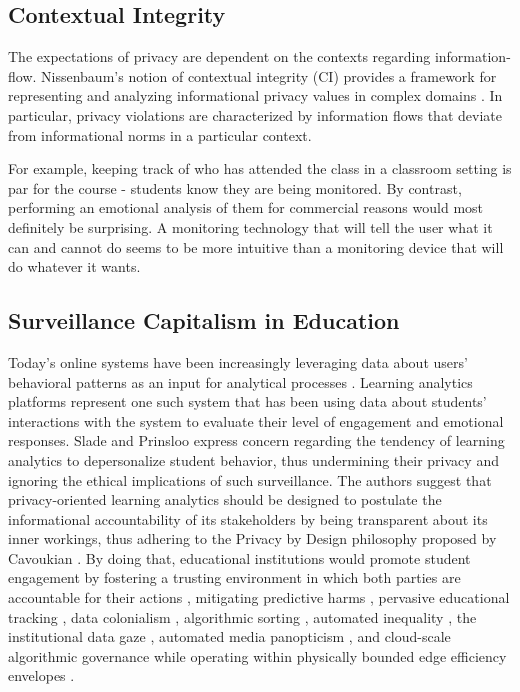\documentclass[conference]{IEEEtran}
\begin{document}
\subsection{Contextual Integrity}
The expectations of privacy are dependent on the contexts regarding information-flow. Nissenbaum’s notion of contextual integrity (CI) provides a framework for representing and analyzing informational privacy values in complex domains \cite{b4}. In particular, privacy violations are characterized by information flows that deviate from informational norms in a particular context.

For example, keeping track of who has attended the class in a classroom setting is par for the course - students know they are being monitored. By contrast, performing an emotional analysis of them for commercial reasons would most definitely be surprising. A monitoring technology that will tell the user what it can and cannot do seems to be more intuitive than a monitoring device that will do whatever it wants.

\subsection{Surveillance Capitalism in Education}
Today’s online systems have been increasingly leveraging data about users’ behavioral patterns as an input for analytical processes \cite{b10}. Learning analytics platforms represent one such system that has been using data about students’ interactions with the system to evaluate their level of engagement and emotional responses. Slade and Prinsloo \cite{b11} express concern regarding the tendency of learning analytics to depersonalize student behavior, thus undermining their privacy and ignoring the ethical implications of such surveillance. The authors suggest that privacy-oriented learning analytics should be designed to postulate the informational accountability of its stakeholders by being transparent about its inner workings, thus adhering to the Privacy by Design philosophy proposed by Cavoukian \cite{b13}. By doing that, educational institutions would promote student engagement by fostering a trusting environment in which both parties are accountable for their actions \cite{b8, b14}, mitigating predictive harms \cite{b22}, pervasive educational tracking \cite{b12}, data colonialism \cite{b18}, algorithmic sorting \cite{b24}, automated inequality \cite{b23}, the institutional data gaze \cite{b19}, automated media panopticism \cite{b20}, and cloud-scale algorithmic governance \cite{b9, b21} while operating within physically bounded edge efficiency envelopes \cite{b27}.
\end{document}
